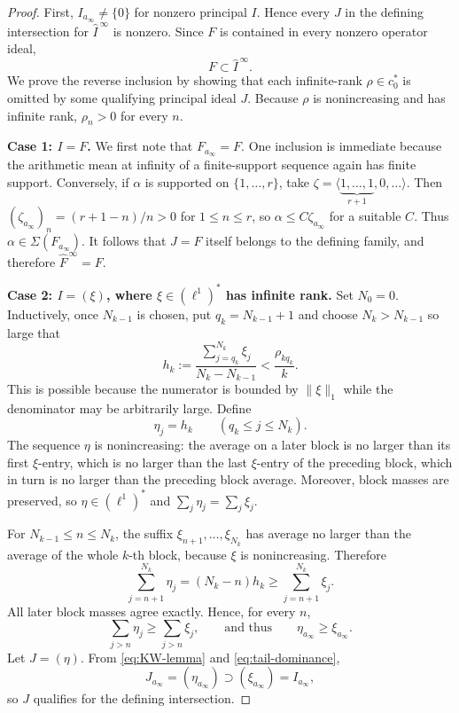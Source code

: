 \documentclass[11pt]{article}
\newcommand{\cstar}{c_0^*}
\newcommand{\ellstar}{(\ell^1)^*}
\newcommand{\ainf}{a_\infty}
\newcommand{\schar}{\Sigma}
\newcommand{\F}{F}
\begin{document}
\begin{proof}
First, $I_{\ainf}\ne\{0\}$ for nonzero principal $I$.  Hence every $J$ in
the defining intersection for $\widehat I^{\,\infty}$ is nonzero.  Since
$\F$ is contained in every nonzero operator ideal,
\begin{equation}\label{eq:lower}
  \F\subset\widehat I^{\,\infty}.
\end{equation}
We prove the reverse inclusion by showing that each infinite-rank
$\rho\in\cstar$ is omitted by some qualifying principal ideal $J$.  Because
$\rho$ is nonincreasing and has infinite rank, $\rho_n>0$ for every $n$.

\smallskip
\noindent\textbf{Case 1: $I=\F$.}
We first note that $\F_{\ainf}=\F$.  One inclusion is immediate because the
arithmetic mean at infinity of a finite-support sequence again has finite
support.  Conversely, if $\alpha$ is supported on $\{1,\dots,r\}$, take
$\zeta=\langle\underbrace{1,\dots,1}_{r+1},0,\dots\rangle$.  Then
$(\zeta_{\ainf})_n=(r+1-n)/n>0$ for $1\le n\le r$, so
$\alpha\le C\zeta_{\ainf}$ for a suitable $C$.  Thus
$\alpha\in\schar(\F_{\ainf})$.  It follows that $J=\F$ itself belongs to the
defining family, and therefore $\widehat{\F}^{\,\infty}=\F$.

\smallskip
\noindent\textbf{Case 2: $I=(\xi)$, where $\xi\in\ellstar$ has infinite
rank.}
Set $N_0=0$.  Inductively, once $N_{k-1}$ is chosen, put
$q_k=N_{k-1}+1$ and choose $N_k>N_{k-1}$ so large that
\begin{equation}\label{eq:hk-summable}
 h_k:=\frac{\sum_{j=q_k}^{N_k}\xi_j}{N_k-N_{k-1}}
       <\frac{\rho_{kq_k}}{k}.
\end{equation}
This is possible because the numerator is bounded by $\|\xi\|_1$ while the
denominator may be arbitrarily large.  Define
\[
 \eta_j=h_k\qquad(q_k\le j\le N_k).
\]
The sequence $\eta$ is nonincreasing: the average on a later block is no
larger than its first $\xi$-entry, which is no larger than the last
$\xi$-entry of the preceding block, which in turn is no larger than the
preceding block average.  Moreover, block masses are preserved, so
$\eta\in\ellstar$ and $\sum_j\eta_j=\sum_j\xi_j$.

For $N_{k-1}\le n\le N_k$, the suffix
$\xi_{n+1},\dots,\xi_{N_k}$ has average no larger than the average of the
whole $k$-th block, because $\xi$ is nonincreasing.  Therefore
\[
 \sum_{j=n+1}^{N_k}\eta_j
   =(N_k-n)h_k
   \ge \sum_{j=n+1}^{N_k}\xi_j.
\]
All later block masses agree exactly.  Hence, for every $n$,
\begin{equation}\label{eq:tail-dominance}
 \sum_{j>n}\eta_j\ge\sum_{j>n}\xi_j,
 \qquad\text{and thus}\qquad
 \eta_{\ainf}\ge\xi_{\ainf}.
\end{equation}
Let $J=(\eta)$.  From \eqref{eq:KW-lemma} and
\eqref{eq:tail-dominance},
\[
 J_{\ainf}=(\eta_{\ainf})\supset(\xi_{\ainf})=I_{\ainf},
\]
so $J$ qualifies for the defining intersection.


\end{proof}
\end{document}
